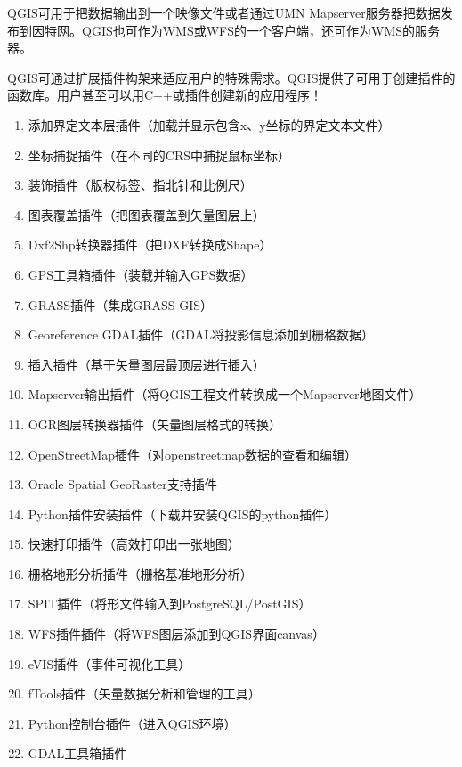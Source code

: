 
QGIS可用于把数据输出到一个映像文件或者通过UMN Mapserver服务器把数据发布到因特网。QGIS也可作为WMS或WFS的一个客户端，还可作为WMS的服务器。


QGIS可通过扩展插件构架来适应用户的特殊需求。QGIS提供了可用于创建插件的函数库。用户甚至可以用C++或插件创建新的应用程序！


\begin{enumerate}
\item 添加界定文本层插件（加载并显示包含x、y坐标的界定文本文件）
\item 坐标捕捉插件（在不同的CRS中捕捉鼠标坐标）
\item 装饰插件（版权标签、指北针和比例尺）
\item 图表覆盖插件（把图表覆盖到矢量图层上）
\item Dxf2Shp转换器插件（把DXF转换成Shape）
\item GPS工具箱插件（装载并输入GPS数据）
\item GRASS插件（集成GRASS GIS）
\item Georeference GDAL插件（GDAL将投影信息添加到栅格数据）
\item 插入插件（基于矢量图层最顶层进行插入）
\item Mapserver输出插件（将QGIS工程文件转换成一个Mapserver地图文件）
\item OGR图层转换器插件（矢量图层格式的转换）
\item OpenStreetMap插件（对openstreetmap数据的查看和编辑）
\item Oracle Spatial GeoRaster支持插件
\item Python插件安装插件（下载并安装QGIS的python插件）
\item 快速打印插件（高效打印出一张地图）
\item 栅格地形分析插件（栅格基准地形分析）
\item SPIT插件（将形文件输入到PostgreSQL/PostGIS）
\item WFS插件插件（将WFS图层添加到QGIS界面canvas）
\item eVIS插件（事件可视化工具）
\item fTools插件（矢量数据分析和管理的工具）
\item Python控制台插件（进入QGIS环境）
\item GDAL工具箱插件
\end{enumerate}



